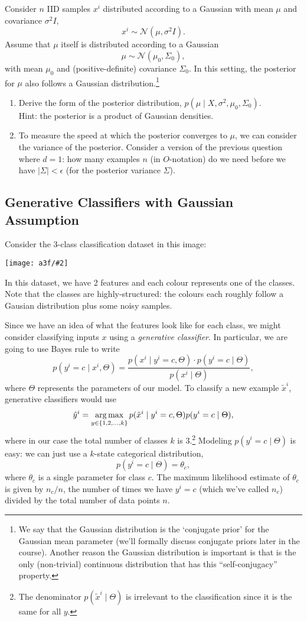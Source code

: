 \documentclass{article}
\def\blu#1{{\color{blu}#1}}
\def\argmax{\mathop{\rm arg\,max}}
\def\cond{\; | \;}
\newcommand{\centerfig}[2]{\begin{center}\texttt{[image: a3f/\#2]}\end{center}}
\def\enum#1{\begin{enumerate}#1\end{enumerate}}
\begin{document}
Consider $n$ IID samples $x^i$ distributed according to a Gaussian with mean $\mu$ and covariance $\sigma^2 I$,
\[
x^i \sim \mathcal{N}(\mu, \sigma^2 I).
\]
Assume that $\mu$ itself is distributed according to a Gaussian
\[
\mu \sim \mathcal{N}(\mu_0,\Sigma_0),
\]
with mean $\mu_0$ and (positive-definite) covariance $\Sigma_0$. In this setting, the posterior for $\mu$ also follows a Gaussian distribution.\footnote{We say that the Gaussian distribution is the `conjugate prior' for the Gaussian mean parameter (we'll formally discuss conjugate priors later in the course). Another reason the Gaussian distribution is important is that is the only (non-trivial) continuous distribution that has this ``self-conjugacy'' property.}

\enum{
\item \blu{Derive the form of the posterior distribution, $p(\mu\cond X, \sigma^2, \mu_0, \Sigma_0)$.}\\
Hint: the posterior is a product of Gaussian densities.
\item To measure the speed at which the posterior converges to $\mu$, we can consider the variance of the posterior. Consider a version of the previous question where $d=1$: \blu{how many examples $n$ (in $O$-notation) do we need before we have $|\Sigma| < \epsilon$} (for the posterior variance $\Sigma$).
}



\subsection{Generative Classifiers with Gaussian Assumption}

Consider the 3-class classification dataset in this image:
\centerfig{.4}{sample}
In this dataset, we have 2 features and each colour represents one of the classes. Note that the classes are highly-structured: the colours each roughly follow a Gausian distribution plus some noisy samples.

Since we have an idea of what the features look like for each class, we might consider classifying  inputs $x$ using a \emph{generative classifier}. In particular, we are going to use Bayes rule to write
\[
p(y^i=c\cond x^i,\Theta) = \frac{p(x^i\cond y^i=c, \Theta) \cdot p(y^i=c\cond\Theta)}{p(x^i\cond\Theta)},
\]
where $\Theta$ represents the parameters of our model. To classify a new example $\tilde{x}^i$, generative classifiers would use
\[
\hat{y}^i = \argmax_{y \in \{1,2,\dots,k\}} p(\tilde{x}^i\cond y^i=c,\Theta)p(y^i=c\cond\Theta),
\]
where in our case the total number of classes $k$ is $3$.\footnote{The denominator $p(\tilde{x}^i\cond\Theta)$ is irrelevant to the classification since it is the same for all $y$.}
Modeling $p(y^i=c\cond\Theta)$ is easy: we can just use a $k$-state categorical distribution,
\[
p(y^i = c \cond \Theta) = \theta_c,
\]
where $\theta_c$ is a single parameter for class $c$. The maximum likelihood estimate of $\theta_c$ is given by $n_c/n$, the number of times we have $y^i = c$ (which we've called $n_c$) divided by the total number of data points $n$.
\end{document}
